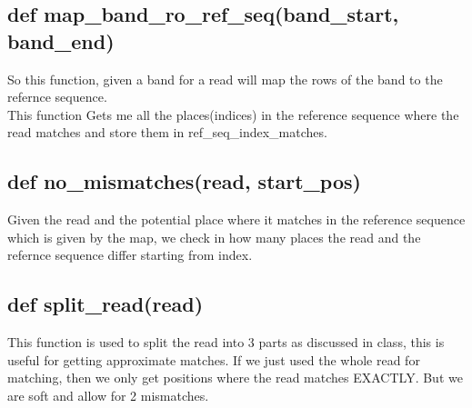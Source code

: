 \documentclass{article}
\begin{document}
\subsection{def map\_band\_ro\_ref\_seq(band\_start, band\_end)}
So this function, given a band for a read will map the rows of the band to the refernce sequence. \\
This function Gets me all the places(indices) in the reference sequence where the read matches and store them in ref\_seq\_index\_matches.
\subsection{def no\_mismatches(read, start\_pos)}
Given the read and the potential place where it matches in the reference sequence which is given by the map, we check in how many places the read and the refernce sequence differ starting from index.
\subsection{def split\_read(read)}
This function is used to split the read into 3 parts as discussed in class, this is useful for getting approximate matches. If we just used the whole read for matching, then we only get positions where the read matches EXACTLY. But we are soft and allow for 2 mismatches.
\end{document}
